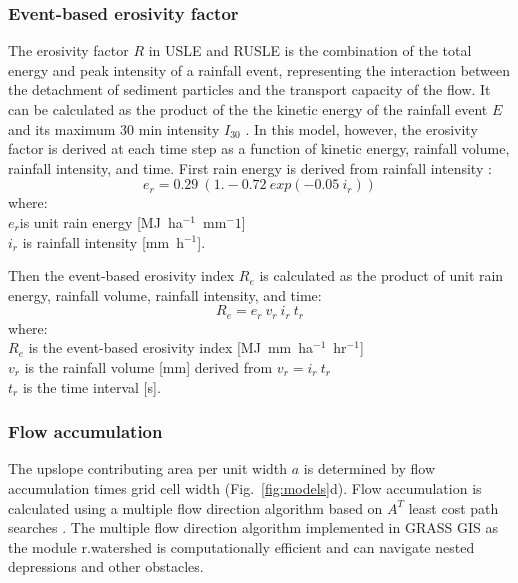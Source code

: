 \documentclass[gmd, manuscript]{copernicus}
\begin{document}
\subsubsection{Event-based erosivity factor}

The erosivity factor $R$ 
in USLE and RUSLE 
is the combination of the total energy 
and peak intensity of a rainfall event,
representing the interaction 
between the detachment of sediment particles
and the transport capacity of the flow. 
It can be calculated as the product of the 
the kinetic energy of the rainfall event $E$
and its maximum 30 \unit{min} intensity $I_{30}$
\citep{Brown1987,Renard1997}.
In this model, however, the erosivity factor
is derived at each time step as a function of
kinetic energy, rainfall volume, rainfall intensity, and time.
First rain energy is derived from rainfall intensity \citep{Brown1987}:
%
\begin{equation}
\label{eq:rain_energy}
{e_r = 0.29 ~ (1.-0.72 ~ exp(-0.05 ~ i_r))}
\end{equation}
%
{\small
\noindent
where: \\
\noindent
\hspace*{0.5em} $e_r$is unit rain energy [\unit{MJ~ha}$^{-1}$~\unit{mm}${^-1}$]\\
\hspace*{0.5em} $i_r$ is rainfall intensity [\unit{mm~h}$^{-1}$].\\
}

\noindent
Then the event-based erosivity index $R_e$ 
is calculated as the product of 
unit rain energy, rainfall volume, rainfall intensity, and time: 
\begin{equation}
\label{eq:erosivity_index}
{R_e = e_r ~ v_r ~ i_r ~ t_r}
\end{equation}
%
{\small
\noindent
where: \\
\hspace*{0.5em} $R_e$ is the event-based erosivity index [\unit{MJ~mm~ha}$^{-1}$~\unit{hr}$^{-1}$]\\
\hspace*{0.5em} $v_r$ is the rainfall volume [\unit{mm}] derived from ${v_r = i_r~t_r}$\\
\hspace*{0.5em} $t_r$ is the time interval [\unit{s}].
}


\subsubsection{Flow accumulation}
%
The upslope contributing area per unit width $a$
is determined by flow accumulation times grid cell width
(Fig.~\ref{fig:models}d). 
Flow accumulation is calculated using 
a multiple flow direction algorithm \citep{Metz2009} 
based on $A^{T}$ least cost path searches \citep{Ehlschlaeger1989}. 
The multiple flow direction algorithm 
implemented in GRASS GIS as the module r.watershed
is computationally efficient and can
navigate nested depressions and other obstacles. 
\end{document}
